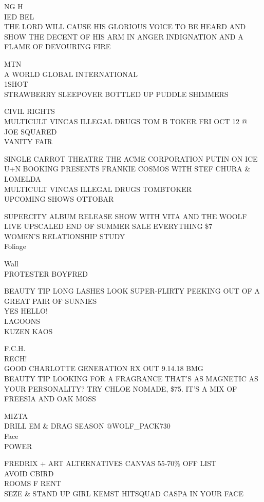 \documentclass[10pt,letterpaper]{article}
\begin{document}
NG H\\
IED BEL\\
THE LORD WILL CAUSE HIS GLORIOUS VOICE TO BE HEARD AND SHOW THE DECENT OF HIS ARM IN ANGER INDIGNATION AND A FLAME OF DEVOURING FIRE

MTN\\
A WORLD GLOBAL INTERNATIONAL\\
1SHOT\\
STRAWBERRY SLEEPOVER BOTTLED UP PUDDLE SHIMMERS

CIVIL RIGHTS\\
MULTICULT VINCAS ILLEGAL DRUGS TOM B TOKER FRI OCT 12 @ JOE SQUARED\\
VANITY FAIR

SINGLE CARROT THEATRE THE ACME CORPORATION PUTIN ON ICE\\
U+N BOOKING PRESENTS FRANKIE COSMOS WITH STEF CHURA \& LOMELDA\\
MULTICULT VINCAS ILLEGAL DRUGS TOMBTOKER\\
UPCOMING SHOWS OTTOBAR

SUPERCITY ALBUM RELEASE SHOW WITH VITA AND THE WOOLF\\
LIVE UPSCALED END OF SUMMER SALE EVERYTHING \$7\\
WOMEN'S RELATIONSHIP STUDY\\
Foliage

Wall\\
PROTESTER BOYFRED

BEAUTY TIP LONG LASHES LOOK SUPER{-}FLIRTY PEEKING OUT OF A GREAT PAIR OF SUNNIES\\
YES HELLO!\\
LAGOONS\\
KUZEN KAOS

F.C.H.\\
RECH!\\
GOOD CHARLOTTE GENERATION RX OUT 9.14.18 BMG\\
BEAUTY TIP LOOKING FOR A FRAGRANCE THAT'S AS MAGNETIC AS YOUR PERSONALITY?  TRY CHLOE NOMADE, \$75.  IT'S A MIX OF FREESIA AND OAK MOSS

MIZTA\\
DRILL EM \& DRAG SEASON @WOLF\_PACK730\\
Face\\
POWER

FREDRIX + ART ALTERNATIVES CANVAS 55{-}70\% OFF LIST\\
AVOID CBIRD\\
ROOMS F RENT\\
SEZE \& STAND UP GIRL KEMST HITSQUAD CASPA IN YOUR FACE
\end{document}
